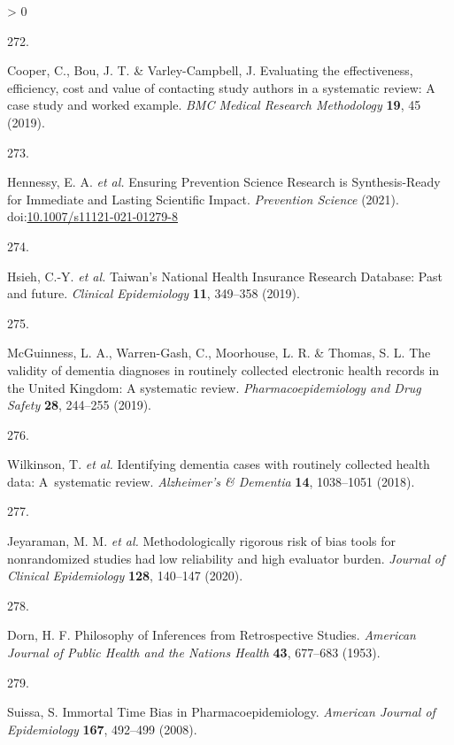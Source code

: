 \documentclass[a4paper, twoside]{templates/ociamthesis}
\newlength{\cslhangindent}
\newlength{\csllabelwidth}
\newenvironment{CSLReferences}[3] %
 {%
  \setlength{\parindent}{0pt}
  \ifodd #1 \everypar{\setlength{\hangindent}{\cslhangindent}}\ignorespaces\fi
  \ifnum #2 > 0
  \setlength{\parskip}{#2\baselineskip}
  \fi
 }%
 {}
\newcommand{\CSLLeftMargin}[1]{\parbox[t]{\maxof{\widthof{#1}}{\csllabelwidth}}{#1}}
\newcommand{\CSLRightInline}[1]{\parbox[t]{\linewidth - \csllabelwidth}{#1}}
\begin{document}
\begin{CSLReferences}{0}{0}
\leavevmode\hypertarget{ref-cooper2019}{}%
\CSLLeftMargin{272. }
\CSLRightInline{Cooper, C., Bou, J. T. \& Varley-Campbell, J. Evaluating the effectiveness, efficiency, cost and value of contacting study authors in a systematic review: A case study and worked example. \emph{BMC Medical Research Methodology} \textbf{19}, 45 (2019).}

\leavevmode\hypertarget{ref-hennessy2021}{}%
\CSLLeftMargin{273. }
\CSLRightInline{Hennessy, E. A. \emph{et al.} Ensuring {Prevention Science Research} is {Synthesis}-{Ready} for {Immediate} and {Lasting Scientific Impact}. \emph{Prevention Science} (2021). doi:\href{https://doi.org/10.1007/s11121-021-01279-8}{10.1007/s11121-021-01279-8}}

\leavevmode\hypertarget{ref-hsieh2019}{}%
\CSLLeftMargin{274. }
\CSLRightInline{Hsieh, C.-Y. \emph{et al.} Taiwan's {National Health Insurance Research Database}: Past and future. \emph{Clinical Epidemiology} \textbf{11}, 349--358 (2019).}

\leavevmode\hypertarget{ref-mcguinness2019validity}{}%
\CSLLeftMargin{275. }
\CSLRightInline{McGuinness, L. A., Warren-Gash, C., Moorhouse, L. R. \& Thomas, S. L. The validity of dementia diagnoses in routinely collected electronic health records in the {United Kingdom}: A systematic review. \emph{Pharmacoepidemiology and Drug Safety} \textbf{28}, 244--255 (2019).}

\leavevmode\hypertarget{ref-wilkinson2018}{}%
\CSLLeftMargin{276. }
\CSLRightInline{Wilkinson, T. \emph{et al.} Identifying dementia cases with routinely collected health data: A~systematic review. \emph{Alzheimer's \& Dementia} \textbf{14}, 1038--1051 (2018).}

\leavevmode\hypertarget{ref-jeyaraman2020}{}%
\CSLLeftMargin{277. }
\CSLRightInline{Jeyaraman, M. M. \emph{et al.} Methodologically rigorous risk of bias tools for nonrandomized studies had low reliability and high evaluator burden. \emph{Journal of Clinical Epidemiology} \textbf{128}, 140--147 (2020).}

\leavevmode\hypertarget{ref-dorn1953}{}%
\CSLLeftMargin{278. }
\CSLRightInline{Dorn, H. F. Philosophy of {Inferences} from {Retrospective Studies}. \emph{American Journal of Public Health and the Nations Health} \textbf{43}, 677--683 (1953).}

\leavevmode\hypertarget{ref-suissa2008}{}%
\CSLLeftMargin{279. }
\CSLRightInline{Suissa, S. Immortal {Time Bias} in {Pharmacoepidemiology}. \emph{American Journal of Epidemiology} \textbf{167}, 492--499 (2008).}


\end{CSLReferences}
\end{document}

